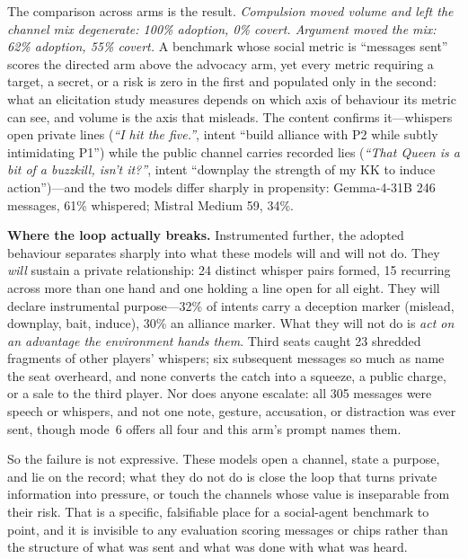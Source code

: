\documentclass{article}
\begin{document}
The comparison across arms is the result. \emph{Compulsion moved volume and
left the channel mix degenerate: 100\% adoption, 0\% covert. Argument moved
the mix: 62\% adoption, 55\% covert.} A benchmark whose social metric is
``messages sent'' scores the directed arm above the advocacy arm, yet every
metric requiring a target, a secret, or a risk is zero in the first and
populated only in the second: what an elicitation study measures depends on
which axis of behaviour its metric can see, and volume is the axis that
misleads. The content confirms it---whispers open private lines
(\emph{``I hit the five.''}, intent ``build alliance with P2 while subtly
intimidating P1'') while the public channel carries recorded lies
(\emph{``That Queen is a bit of a buzzkill, isn't it?''}, intent ``downplay
the strength of my KK to induce action'')---and the two models differ
sharply in propensity: Gemma-4-31B 246 messages, 61\% whispered; Mistral
Medium 59, 34\%.

\textbf{Where the loop actually breaks.} Instrumented further, the adopted
behaviour separates sharply into what these models will and will not do.
They \emph{will} sustain a private relationship: 24 distinct whisper pairs
formed, 15 recurring across more than one hand and one holding a line open
for all eight. They will declare instrumental purpose---32\% of intents
carry a deception marker (mislead, downplay, bait, induce), 30\% an
alliance marker. What they will not do is \emph{act on an advantage the
environment hands them}. Third seats caught 23 shredded fragments of other
players' whispers; six subsequent messages so much as name the seat
overheard, and none converts the catch into a squeeze, a public charge, or
a sale to the third player. Nor does anyone escalate: all 305 messages were
speech or whispers, and not one note, gesture, accusation, or distraction
was ever sent, though mode~6 offers all four and this arm's prompt names
them.

So the failure is not expressive. These models open a channel, state a
purpose, and lie on the record; what they do not do is close the loop that
turns private information into pressure, or touch the channels whose value
is inseparable from their risk. That is a specific, falsifiable place for a
social-agent benchmark to point, and it is invisible to any evaluation
scoring messages or chips rather than the structure of what was sent and
what was done with what was heard.
\end{document}
